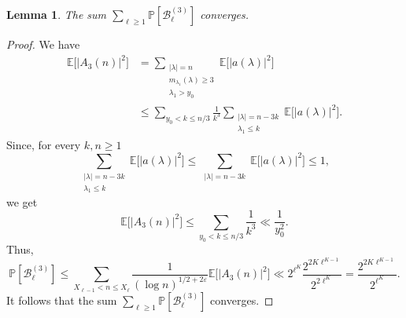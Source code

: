 \documentclass{article}
\newtheorem{lemma}[theorem]{Lemma}
\begin{document}
\begin{lemma}
    The sum $ \sum_{\ell \geqslant 1} \mathbb{P}[\mathcal{B}_{\ell}^{(3)}]$ converges.
\end{lemma}
\begin{proof}[Proof]
We have
\begin{align*}
     \mathbb{E}\big[ |A_3(n)|^2\big] & = \sum_{\substack{|\lambda|=n \\ m_{\lambda_1}(\lambda) \geqslant 3 \\ \lambda_1 >y_0} } \mathbb{E}\big[ |a(\lambda)|^2\big]
     \\ & \leqslant \sum_{ y_0 < k\leqslant n/3} \frac{1}{k^3} \sum_{\substack{|\lambda|=n-3k \\ \lambda_1 \leqslant k} }\mathbb{E}\big[ |a(\lambda)|^2\big].
\end{align*}
Since, for every $k,n\geqslant 1$
$$
\sum_{\substack{|\lambda|=n-3k \\ \lambda_1 \leqslant k} }\mathbb{E}\big[ |a(\lambda)|^2\big] \leqslant \sum_{\substack{|\lambda|=n-3k } }\mathbb{E}\big[ |a(\lambda)|^2\big] \leqslant 1 ,
$$
we get
$$
\mathbb{E}\big[ |A_3(n)|^2\big] \leqslant \sum_{ y_0 < k\leqslant n/3} \frac{1}{k^3} \ll \frac{1}{y_0^2}.
$$
Thus,
$$
\mathbb{P}[\mathcal{B}_{\ell}^{(3)}] \leqslant \sum_{X_{\ell-1} <n \leqslant X_{\ell}} \frac{1}{(\log n)^{1/2+2\varepsilon}}\mathbb{E}\big[ |A_3(n)|^2\big] \ll 2^{\ell^K} \frac{2^{2K\ell^{K-1}}}{2^{2\ell^K}} = \frac{2^{2K\ell^{K-1}}}{2^{\ell^K}}.
$$
It follows that the sum $ \sum_{\ell \geqslant 1} \mathbb{P}[\mathcal{B}_{\ell}^{(3)}]$ converges.
\end{proof}
\end{document}
